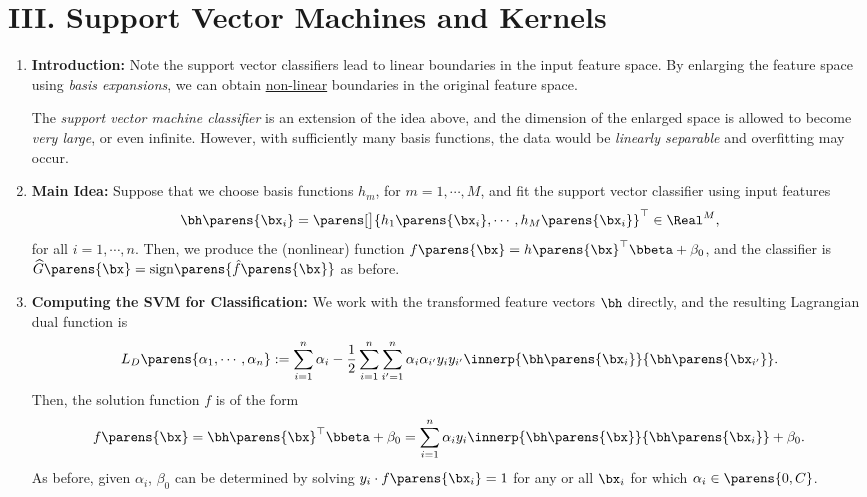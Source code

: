 \documentclass[12pt]{article}
\begin{document}
\section*{III. Support Vector Machines and Kernels}

\begin{enumerate}[label=\textbf{\arabic*.}]

	\item \textbf{Introduction:} Note the support vector classifiers lead to linear boundaries in the input feature space. By enlarging the feature space using \emph{basis expansions}, we can obtain \underline{non-linear} boundaries in the original feature space. 
	
	The \textit{support vector machine classifier} is an extension of the idea above, and the dimension of the enlarged space is allowed to become \textit{very large}, or even infinite. However, with sufficiently many basis functions, the data would be \emph{linearly separable} and overfitting may occur. 
	
	\item \textbf{Main Idea:} Suppose that we choose basis functions $h_m$, for $m = 1, \cdots, M$, and fit the support vector classifier using input features 
	\begin{equation*}
		\bh \parens{\bx_i} = \parens[\big]{h_1 \parens{\bx_i}, \cdots, h_M \parens{\bx_i}}^\top \in \Real^{M}, 
	\end{equation*}
	for all $i = 1, \cdots, n$. Then, we produce the (nonlinear) function $f \parens{\bx} = h \parens{\bx}^\top \bbeta + \beta_0$, and the classifier is $\widehat{G} \parens{\bx} = \mathrm{sign} \parens{\hat{f}\parens{\bx}}$ as before. 
	
	\item \textbf{Computing the SVM for Classification:} We work with the transformed feature vectors $\bh$ directly, and the resulting Lagrangian dual function is 
	\begin{equation}\label{dualsvm}
		L_D \parens{\alpha_1, \cdots, \alpha_n} := \sum_{i=1}^n \alpha_i - \frac{1}{2} \sum_{i=1}^n \sum_{i'=1}^n \alpha_i \alpha_{i'} y_{i} y_{i'} \innerp{\bh \parens{\bx_i}}{\bh \parens{\bx_{i'}}}. 
	\end{equation}
	Then, the solution function $f$ is of the form 
	\begin{align}\label{solsvm}
		f \parens{\bx} = \bh \parens{\bx}^\top \bbeta + \beta_0 = \sum_{i=1}^n \alpha_i y_{i} \innerp{\bh \parens{\bx}}{\bh \parens{\bx_{i}}} + \beta_0. 
	\end{align}
	As before, given $\alpha_i$, $\beta_0$ can be determined by solving $y_i \cdot f \parens{\bx_i} = 1$ for any or all $\bx_i$ for which $\alpha_i \in \parens{0, C}$. 
	

\end{enumerate}
\end{document}
